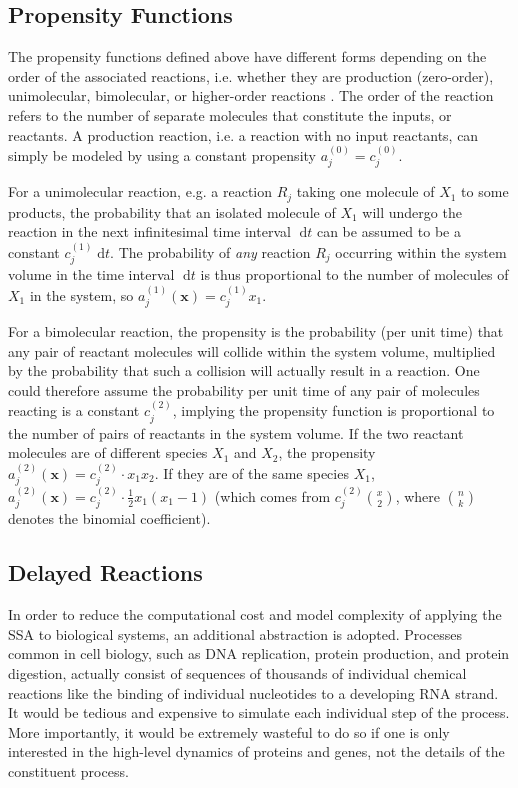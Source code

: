 \documentclass[english,letterpaper,12pt]{report}
\newcommand{\dee}{\;\mathrm{d}}
\renewcommand{\vec}[1]{\ensuremath{\mathbf{#1}}}
\begin{document}
\begin{doublespacing}
\subsection{Propensity Functions} %
\label{sub:propensities}

The propensity functions defined above have different forms depending on the order of the associated reactions, i.e. whether they are production (zero-order), unimolecular, bimolecular, or higher-order reactions \cite{gillespie-ssa}. The order of the reaction refers to the number of separate molecules that constitute the inputs, or reactants. A production reaction, i.e. a reaction with no input reactants, can simply be modeled by using a constant propensity $a_j^{(0)} = c_j^{(0)}$. 

For a unimolecular reaction, e.g. a reaction $R_j$ taking one molecule of $X_1$ to some products, the probability that an isolated molecule of $X_1$ will undergo the reaction in the next infinitesimal time interval $\dee t$ can be assumed to be a constant $c_j^{(1)} \dee t$. The probability of \emph{any} reaction $R_j$ occurring within the system volume in the time interval $\dee t$ is thus proportional to the number of molecules of $X_1$ in the system, so $a_j^{(1)}(\vec{x}) = c_j^{(1)} x_1$.

For a bimolecular reaction, the propensity is the probability (per unit time) that any pair of reactant molecules will collide within the system volume, multiplied by the probability that such a collision will actually result in a reaction. One could therefore assume the probability per unit time of any pair of molecules reacting is a constant $c_j^{(2)}$, implying the propensity function is proportional to the number of pairs of reactants in the system volume. If the two reactant molecules are of different species $X_1$ and $X_2$, the propensity $a_j^{(2)}(\vec{x}) = c_j^{(2)} \cdot x_1 x_2$. If they are of the same species $X_1$, $a_j^{(2)}(\vec{x}) = c_j^{(2)} \cdot \frac{1}{2}x_1(x_1 - 1)$ (which comes from $c_j^{(2)}\binom{x}{2}$, where $\binom{n}{k}$ denotes the binomial coefficient).


\subsection{Delayed Reactions} %
\label{sub:delayed-reactions}

In order to reduce the computational cost and model complexity of applying the SSA to biological systems, an additional abstraction is adopted. Processes common in cell biology, such as DNA replication, protein production, and protein digestion, actually consist of sequences of thousands of individual chemical reactions like the binding of individual nucleotides to a developing RNA strand. It would be tedious and expensive to simulate each individual step of the process. More importantly, it would be extremely wasteful to do so if one is only interested in the high-level dynamics of proteins and genes, not the details of the constituent process.


\end{doublespacing}
\end{document}
